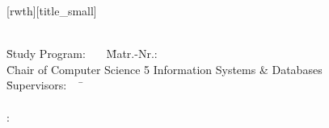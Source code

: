 \documentclass[aspectratio=169]{beamer}
\author[\firstname]{\firstname~\lastname~\email}
\institute[RWTH]{RWTH Aachen University}
\begin{document}


[rwth][title_small]{}
\begin{frame}[plain]
  \vspace{1cm}
  \titlepage

  \vspace{-6em}
  \parbox{0cm}{
    \begin{tabbing}
      \=\textbf{\firstname~\lastname}\=\\[0.4em]
      \=Study Program: \studyProgram~~~\=Matr.-Nr.:\matrNo\\[0.4em]
      \=Chair of Computer Science 5 Information Systems \& Databases \=\\[0.4em]
      \={Supervisors}:~~~\=\firstsupervisor\\
      \>                 \>\secondsupervisor\\[0.4em]
      :       \>\firstadvisor\ifdefined\secondadvisor\\
        \>                 \>\secondadvisor\\[0.4em]
      \fi
    \end{tabbing}
  }
\end{frame}

\end{document}

